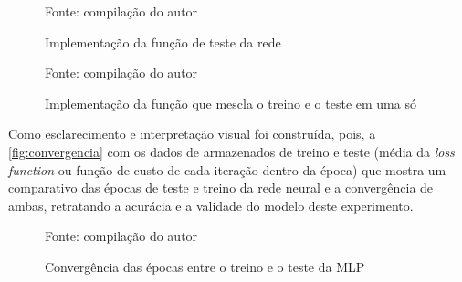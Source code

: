 \begin{figure}[H]
	\centering
	\caption{Implementação da função de teste da rede}
	
	\label{fig:test}
	{\scriptsize Fonte: compilação do autor}
\end{figure}

\begin{figure}[H]
	\centering
	\caption{Implementação da função que mescla o treino e o teste em uma só}
	
	\label{fig:forward}
	{\scriptsize Fonte: compilação do autor}
\end{figure}

Como esclarecimento e interpretação visual foi construída, pois, a \autoref{fig:convergencia} com os dados de armazenados de treino e teste (média da \textit{loss function} ou função de custo de cada iteração dentro da época) que mostra um comparativo das épocas de teste e treino da rede neural e a convergência de ambas, retratando a acurácia e a validade do modelo deste experimento.

\begin{figure}
	\centering
	\caption{Convergência das épocas entre o treino e o teste da MLP}
	
	\label{fig:convergencia}
	{\scriptsize Fonte: compilação do autor}
\end{figure}

